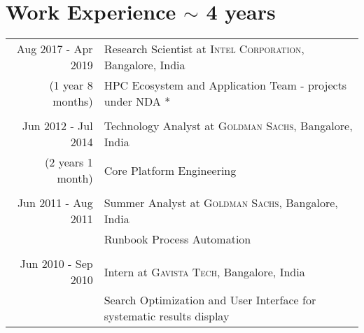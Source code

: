 \documentclass[a4paper,10pt]{article} %
\begin{document}

\section{Work Experience $\sim$ 4 years}

\begin{tabular}{r|p{10cm}}
Aug 2017 - Apr 2019 & Research Scientist at \textsc{Intel Corporation}, Bangalore, India \\
{\footnotesize(1 year 8 months)} & \footnotesize{HPC Ecosystem and Application Team} - projects under NDA *\\
&\\

Jun 2012 - Jul 2014 & Technology Analyst at \textsc{Goldman Sachs}, Bangalore, India \\
{\footnotesize (2 years 1 month)} & \footnotesize{Core Platform Engineering}\\ 
& \\



Jun 2011 - Aug 2011 & Summer Analyst at \textsc{Goldman Sachs}, Bangalore, India \\
& \footnotesize{Runbook Process Automation}\\
& \\


Jun 2010 - Sep 2010 & Intern at \textsc{Gavista Tech}, Bangalore, India\\
& \footnotesize{Search Optimization and User Interface for systematic results display}\\

\end{tabular}


\end{document}
